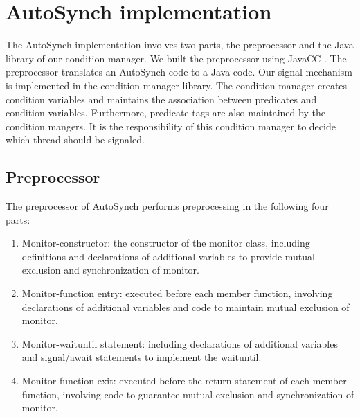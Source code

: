 \documentclass[preprint]{sigplanconf}
\begin{document}
\section{AutoSynch implementation} \label{sec:imp}
The AutoSynch implementation involves two parts, the preprocessor and the Java
library of our condition manager. We built the preprocessor using JavaCC
\cite{kod04}. The preprocessor translates an AutoSynch code to a Java code. Our
signal-mechanism is implemented in the condition manager library. 
The condition manager creates condition variables and maintains the association 
between predicates and condition variables. Furthermore, predicate tags are 
also maintained by the condition mangers. It is the responsibility of this
condition manager to decide which thread should be signaled. 
\subsection{Preprocessor}
The preprocessor of AutoSynch performs preprocessing in the following four 
parts:
\begin{enumerate}
  \item Monitor-constructor: the constructor of the monitor class, including 
    definitions and declarations of additional variables to provide mutual 
    exclusion and synchronization of monitor. 
  \item Monitor-function entry: executed before each member function, 
    involving declarations of additional variables and code to maintain
    mutual exclusion of monitor. 
  \item Monitor-waituntil statement: including declarations of additional
    variables and signal/await statements to implement the waituntil.
  \item Monitor-function exit: executed before the return statement of 
    each member function, involving code to guarantee mutual exclusion and 
    synchronization of monitor. 
\end{enumerate}
\end{document}
